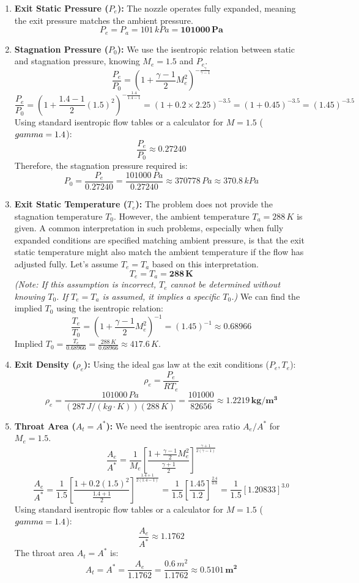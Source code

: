 \begin{enumerate}
\def\labelenumi{\arabic{enumi}.}
\item
  \textbf{Exit Static Pressure (\(P_e\)):} The nozzle operates fully
  expanded, meaning the exit pressure matches the ambient pressure.
  \[ P_e = P_a = 101 \, kPa = \mathbf{101000 \, Pa} \]
\item
  \textbf{Stagnation Pressure (\(P_0\)):} We use the isentropic relation
  between static and stagnation pressure, knowing \(M_e = 1.5\) and
  \(P_e\).
  \[ \frac{P_e}{P_0} = \left( 1 + \frac{\gamma-1}{2} M_e^2 \right)^{-\frac{\gamma}{\gamma-1}} \]
  \[ \frac{P_e}{P_0} = \left( 1 + \frac{1.4-1}{2} (1.5)^2 \right)^{-\frac{1.4}{1.4-1}} = (1 + 0.2 \times 2.25)^{-3.5} = (1 + 0.45)^{-3.5} = (1.45)^{-3.5} \]
  Using standard isentropic flow tables or a calculator for \(M=1.5\)
  (\(\\gamma=1.4\)): \[ \frac{P_e}{P_0} \approx 0.27240 \] Therefore,
  the stagnation pressure required is:
  \[ P_0 = \frac{P_e}{0.27240} = \frac{101000 \, Pa}{0.27240} \approx 370778 \, Pa \approx 370.8 \, kPa \]
\item
  \textbf{Exit Static Temperature (\(T_e\)):} The problem does not
  provide the stagnation temperature \(T_0\). However, the ambient
  temperature \(T_a = 288 \, K\) is given. A common interpretation in
  such problems, especially when fully expanded conditions are specified
  matching ambient pressure, is that the exit static temperature might
  also match the ambient temperature if the flow has adjusted fully.
  Let's assume \(T_e = T_a\) based on this interpretation.
  \[ T_e = T_a = \mathbf{288 \, K} \] \emph{(Note: If this assumption is
  incorrect, \(T_e\) cannot be determined without knowing \(T_0\). If
  \(T_e = T_a\) is assumed, it implies a specific \(T_0\).)} We can find
  the implied \(T_0\) using the isentropic relation:
  \[ \frac{T_e}{T_0} = \left( 1 + \frac{\gamma-1}{2} M_e^2 \right)^{-1} = (1.45)^{-1} \approx 0.68966 \]
  Implied
  \(T_0 = \frac{T_e}{0.68966} = \frac{288 \, K}{0.68966} \approx 417.6 \, K\).
\item
  \textbf{Exit Density (\(\rho_e\)):} Using the ideal gas law at the
  exit conditions (\(P_e, T_e\)): \[ \rho_e = \frac{P_e}{R T_e} \]
  \[ \rho_e = \frac{101000 \, Pa}{(287 \, J/(kg \cdot K))(288 \, K)} = \frac{101000}{82656} \approx \mathbf{1.2219 \, kg/m^3} \]
\item
  \textbf{Throat Area (\(A_t = A^*\)):} We need the isentropic area
  ratio \(A_e / A^*\) for \(M_e = 1.5\).
  \[ \frac{A_e}{A^*} = \frac{1}{M_e} \left[ \frac{1 + \frac{\gamma-1}{2} M_e^2}{\frac{\gamma+1}{2}} \right]^{\frac{\gamma+1}{2(\gamma-1)}} \]
  \[ \frac{A_e}{A^*} = \frac{1}{1.5} \left[ \frac{1 + 0.2(1.5)^2}{\frac{1.4+1}{2}} \right]^{\frac{1.4+1}{2(1.4-1)}} = \frac{1}{1.5} \left[ \frac{1.45}{1.2} \right]^{\frac{2.4}{0.8}} = \frac{1}{1.5} [1.20833]^{3.0} \]
  Using standard isentropic flow tables or a calculator for \(M=1.5\)
  (\(\\gamma=1.4\)): \[ \frac{A_e}{A^*} \approx 1.1762 \] The throat
  area \(A_t = A^*\) is:
  \[ A_t = A^* = \frac{A_e}{1.1762} = \frac{0.6 \, m^2}{1.1762} \approx \mathbf{0.5101 \, m^2} \]
\end{enumerate}

